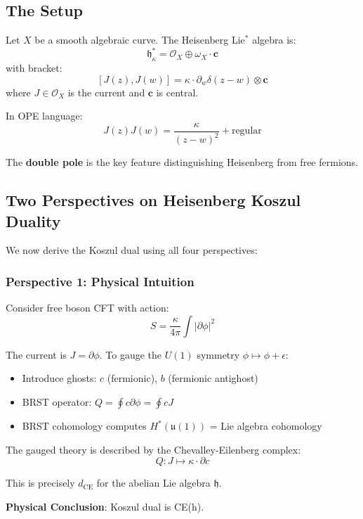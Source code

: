 \subsection{The Setup}

\begin{definition}
Let $X$ be a smooth algebraic curve. The Heisenberg Lie$^*$ algebra is:
$$\mathfrak{h}_\kappa^* = \mathcal{O}_X \oplus \omega_X \cdot \mathbf{c}$$
with bracket:
$$[J(z), J(w)] = \kappa \cdot \partial_w \delta(z-w) \otimes \mathbf{c}$$
where $J \in \mathcal{O}_X$ is the current and $\mathbf{c}$ is central.
\end{definition}

In OPE language:
$$J(z)J(w) = \frac{\kappa}{(z-w)^2} + \text{regular}$$

The \textbf{double pole} is the key feature distinguishing Heisenberg from free fermions.

\subsection{Two Perspectives on Heisenberg Koszul Duality}

We now derive the Koszul dual using all four perspectives:

\subsubsection{Perspective 1: Physical Intuition}

Consider free boson CFT with action:
$$S = \frac{\kappa}{4\pi} \int |\partial \phi|^2$$

The current is $J = \partial\phi$. To gauge the $U(1)$ symmetry $\phi \mapsto \phi + \epsilon$:
\begin{itemize}
\item Introduce ghosts: $c$ (fermionic), $b$ (fermionic antighost)
\item BRST operator: $Q = \oint c \partial\phi = \oint cJ$
\item BRST cohomology computes $H^*(\mathfrak{u}(1))$ = Lie algebra cohomology
\end{itemize}

The gauged theory is described by the Chevalley-Eilenberg complex:
$$Q: J \mapsto \kappa \cdot \partial c$$

This is precisely $d_{\text{CE}}$ for the abelian Lie algebra $\mathfrak{h}$.

\textbf{Physical Conclusion}: Koszul dual is CE(h).


